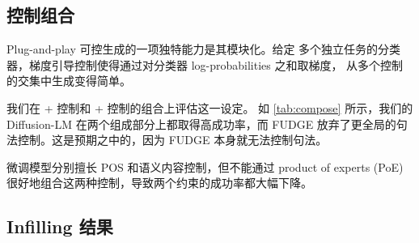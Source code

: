 \documentclass{article}
\begin{document}
\subsection{控制组合}
\label{ssec:compose}
\begin{table}
    \centering
\caption{\label{tab:compose} 在该实验中，我们组合语义控制和句法控制：Diffusion-LM 以一定流畅性（\fluency）为代价取得更高成功率（\success）。我们的方法在控制成功率上优于 FUDGE 和 FT-PoE（两个微调模型的 product of experts），尤其是在结构化句法控制（即句法解析树和 POS）上。
}
\end{table}


Plug-and-play 可控生成的一项独特能力是其模块化。给定
多个独立任务的分类器，梯度引导控制使得通过对分类器 log-probabilities 之和取梯度，
从多个控制的交集中生成变得简单。


我们在 \Content + \Syntax 控制和 \Content + \POS 控制的组合上评估这一设定。
如 \cref{tab:compose} 所示，我们的 Diffusion-LM 在两个组成部分上都取得高成功率，而 FUDGE 放弃了更全局的句法控制。这是预期之中的，因为 FUDGE 本身就无法控制句法。

微调模型分别擅长 POS 和语义内容控制，但不能通过 product of experts (PoE) 很好地组合这两种控制，导致两个约束的成功率都大幅下降。


 

\subsection{Infilling 结果}
\label{ssec:infill}
\end{document}
